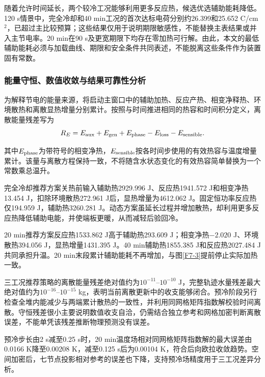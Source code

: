\documentclass[bwprint]{gmcmthesis}
\numberwithin{equation}{section}
\numberwithin{figure}{section}
\begin{document}
随着允许时间延长，两个较冷工况能够利用更多反应热，候选优选辅助能耗降低。120 s情景中，完全冷却和40 min工况的首次达标电荷分别约26.399和25.652 C/cm$^2$，已超过主比较预算；这些结果仅用于说明期限敏感性，不能替换主表结果或并入主节电率。20 min在90 s及更宽期限下均存在零加热可行解。由此，本文的最低辅助能耗必须与加载曲线、期限和安全条件共同表述，不能脱离这些条件作为装置固有常数。

\subsubsection{能量守恒、数值收敛与结果可靠性分析}

\begin{samepage}
为解释节电的能量来源，将启动主窗口中的辅助加热、反应产热、相变净释热、环境散热和离散显热增量分别累计。按照与时间推进相同的热容和时间积分定义，离散能量残差写为
\begin{equation}
R_E=E_{\rm aux}+E_{\rm gen}+E_{\rm phase}-E_{\rm loss}-E_{\rm sensible}.
\label{eq:q4:energyresidual}
\end{equation}
\end{samepage}
其中\(E_{\rm phase}\)为带符号的相变净热，\(E_{\rm sensible}\)按各时间步使用的有效热容与温度增量累计。该量与离散方程保持一致，不将随含水状态变化的有效热容简单替换为一个常数乘总温升。


完全冷却推荐方案关热前输入辅助热2929.996 J、反应热1941.572 J和相变净热13.454 J，扣除环境散热272.961 J后，显热增量为4612.062 J。固定恒功率反应热仅194.959 J，辅助热3260.281 J。动态方案虽延长过程并增加散热，却利用更多反应热降低辅助电能，并使端板更暖，从而减轻后验回冷。

20 min推荐方案反应热1533.862 J高于辅助热293.609 J；相变净热\(-2.020\) J、环境散热394.056 J，显热增量1431.395 J。40 min辅助热1855.385 J和反应热2027.484 J共同承担升温。20 min末段累计辅助能耗不再增加，与图\ref{F7-3}提前停止实际加热一致。

三工况推荐策略的离散能量残差绝对值约为\(10^{-11}\)--\(10^{-10}\) J，完整轨迹水量残差最大绝对值约为\(10^{-16}\)--\(10^{-15}\) kg，表明当前离散更新中的收支能够闭合。预冷阶段另行检查全堆内能减少与两端累计散热的一致性，并利用同网格矩阵指数解校验时间离散。守恒残差很小主要说明数值收支自洽，仍需结合独立参考和网格加密判断离散误差，不能单凭该残差推断物理预测没有误差。


预冷步长由2 s减至0.25 s时，20 min温度场相对同网格矩阵指数解的最大误差由0.0166 K降至0.00208 K，减至0.125 s后为0.00104 K，符合后向欧拉收敛趋势。空间加密后，七节点投影相对参考的误差也下降，支持预冷场精度用于三工况差异分析。
\end{document}
